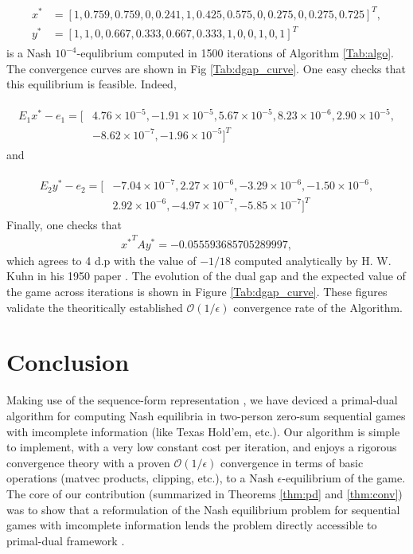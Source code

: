 \documentclass[envcountsame]{llncs} %
\begin{document}
\begin{eqnarray*}
  \begin{split}
    x^* &= [1, 0.759, 0.759, 0, 0.241, 1, 0.425, 0.575, 0, 0.275, 0,
      0.275, 0.725]^T,\\
    y^* &= [1, 1, 0, 0.667, 0.333, 0.667, 0.333, 1, 0, 0, 1, 0, 1]^T
    \end{split}
\end{eqnarray*}
is a Nash $10^{-4}$-equlibrium computed in 1500 iterations of
Algorithm  \ref{Tab:algo}. The convergence curves are shown
in Fig \ref{Tab:dgap_curve}. One easy checks that this equilibrium is
feasible. Indeed,

\begin{eqnarray*}
  \begin{split}
    E_1x^* - e_1 = [&4.76 \times 10^{-5}, -1.91 \times 10^{-5}, 5.67
      \times 10^{-5}, 8.23 \times 10^{-6}, 2.90 \times 10^{-5}, \\&
      -8.62 \times 10^{-7}, -1.96 \times 10^{-5}]^T
    \end{split}
\end{eqnarray*}
and

\begin{eqnarray*}
  \begin{split}
    E_2y^* - e_2 = [&-7.04 \times 10^{-7}, 2.27 \times 10^{-6}, -3.29
      \times 10^{-6}, -1.50 \times 10^{-6},\\
      &2.92 \times 10^{-6}, -4.97 \times 10^{-7}, -5.85 \times
      10^{-7}]^T
    \end{split}
\end{eqnarray*}
Finally, one checks that
\begin{eqnarray*}
  {x^*}^TAy^* = -0.055593685705289997,
\end{eqnarray*}
 which agrees to 4 d.p with the value of $-1 / 18$ computed
 analytically by H. W. Kuhn in his 1950 paper \cite{kuhn}. The
 evolution of the dual gap and the expected value of the game across
 iterations is shown in Figure \ref{Tab:dgap_curve}. These figures
 validate the theoritically established $\mathcal{O}(1/\epsilon)$
 convergence rate of the Algorithm.


\section{Conclusion}
Making use of the sequence-form representation
\cite{koller1992complexity,von1996efficient,vonequilibrium}, we have
deviced a primal-dual algorithm for computing Nash equilibria in
two-person zero-sum sequential games with imcomplete information (like
Texas Hold'em, etc.). Our algorithm is simple to implement, with a
very low constant cost per iteration, and enjoys a rigorous
convergence theory with a proven $\mathcal{O}(1/\epsilon)$ convergence
in terms of basic operations (matvec products, clipping, etc.), to a
Nash $\epsilon$-equilibrium of the game. The core of our contribution
(summarized in Theorems \ref{thm:pd} and \ref{thm:conv}) was to show
that a reformulation of the Nash equilibrium problem for sequential
games with imcomplete information lends the problem directly
accessible to primal-dual framework
\cite{chambolle2010,chambolle2014ergodic}.
\end{document}
